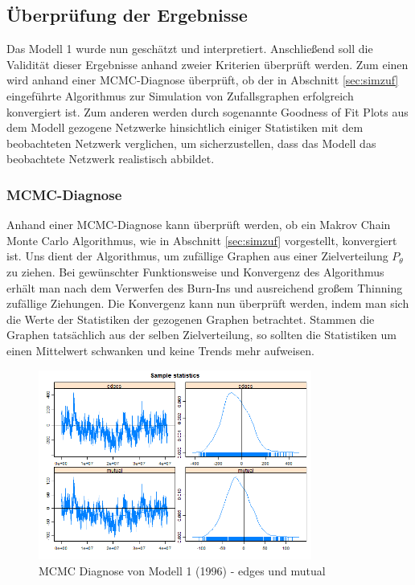 \documentclass[a4paper,ngerman,oneside,titlepage,bibliography=totoc,11pt]{scrreprt}
\begin{document}
\subsection{Überprüfung der Ergebnisse}
Das Modell 1 wurde nun geschätzt und interpretiert. Anschließend soll die Validität dieser Ergebnisse anhand zweier Kriterien überprüft werden. Zum einen wird anhand einer MCMC-Diagnose überprüft, ob der in Abschnitt \ref{sec:simzuf} eingeführte Algorithmus zur Simulation von Zufallsgraphen erfolgreich konvergiert ist. Zum anderen werden durch sogenannte Goodness of Fit Plots aus dem Modell gezogene Netzwerke hinsichtlich einiger Statistiken mit dem beobachteten Netzwerk verglichen, um sicherzustellen, dass das Modell das beobachtete Netzwerk realistisch abbildet.
\subsubsection{MCMC-Diagnose}
Anhand einer MCMC-Diagnose kann überprüft werden, ob ein Makrov Chain Monte Carlo Algorithmus, wie in Abschnitt \ref{sec:simzuf} vorgestellt, konvergiert ist. Uns dient der Algorithmus, um zufällige Graphen aus einer Zielverteilung $P_{\theta}$ zu ziehen. Bei gewünschter Funktionsweise und Konvergenz des Algorithmus erhält man nach dem Verwerfen des Burn-Ins und ausreichend großem Thinning zufällige Ziehungen. Die Konvergenz kann nun überprüft werden, indem man sich die Werte der Statistiken der gezogenen Graphen betrachtet. Stammen die Graphen tatsächlich aus der selben Zielverteilung, so sollten die Statistiken um einen Mittelwert schwanken und keine Trends mehr aufweisen.

	\begin{figure}[h]
	\centering
		\includegraphics[width=0.8\textwidth]{Grafiken/mcmc_diag1.png}
	\caption{MCMC Diagnose von Modell 1 (1996) - edges und mutual}
	\end{figure}
	
\end{document}
